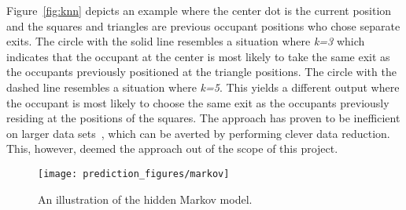 Figure~\ref{fig:knn} depicts an example where the center dot is the current position and the squares and triangles are previous occupant positions who chose separate exits. The circle with the solid line resembles a situation where \emph{k=3} which indicates that the occupant at the center is most likely to take the same exit as the occupants previously positioned at the triangle positions. The circle with the dashed line resembles a situation where \emph{k=5}. This yields a different output where the occupant is most likely to choose the same exit as the occupants previously residing at the positions of the squares. The approach has proven to be inefficient on larger data sets~\cite{bhatia}, which can be averted by performing clever data reduction. This, however, deemed the approach out of the scope of this project.
\begin{figure}
\centering
\texttt{[image: prediction\_figures/markov]}
\caption{An illustration of the hidden Markov model.}
\label{fig:markov}
\end{figure}


